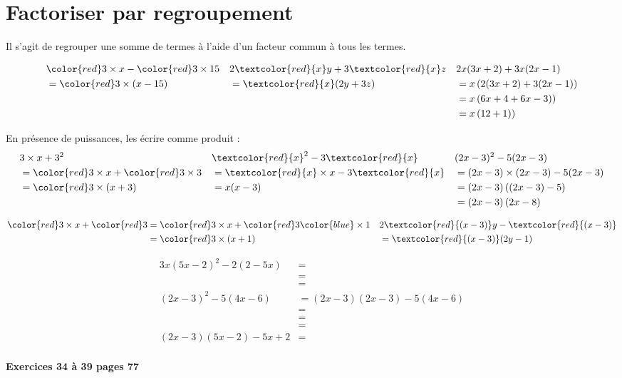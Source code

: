 \documentclass[main.tex]{subfiles}
\begin{document}
\section{Factoriser  par regroupement}
Il s'agit de regrouper une somme de termes à l'aide d'un facteur commun à tous les termes.
\begin{example}\hfill 
	\begin{align*}
		&	{\color{red}3}\times x - {\color{red}3}\times 15  
		&&  
		2\textcolor{red}{x}y+3\textcolor{red}{x}z
		&& 2x(3x+2) + 3x(2x-1) \\
		&= {\color{red}3} \times (x-15) && =\textcolor{red}{x}(2y+3z)
		&& = x\left(2 (3x+2) + 3 (2x-1)\right) \\
		& && && = x\left(6x+4 + 6x-3)\right)\\
		& && && = x\left(12+1)\right)
	\end{align*}
\end{example}
\begin{example}[Puissances] En présence de puissances, les écrire comme produit : 
	\begin{align*}
		&3\times x + {3}^2   
		&&\textcolor{red}{x}^2-3\textcolor{red}{x}
		&& (2x-3)^2- 5(2x-3) \\
		& = {\color{red}3}\times x + {\color{red}3}\times 3
		&&  =\textcolor{red}{x}\times x-3\textcolor{red}{x}  
		&&=(2x-3)\times(2x-3)-5(2x-3)  \\
		&= {\color{red}3}\times (x+3)    &&=x(x-3) &&= (2x-3) \left((2x-3)-5\right) \\
		&    && &&= (2x-3) \left(2x-8\right) 
	\end{align*}  
\end{example}
\begin{example}[règle du 1]
	\begin{align*}
		{\color{red}3} \times x + {\color{red}3} &= {\color{red}3}\times x + {\color{red}3}{\color{blue} \times 1}  && 2\textcolor{red}{(x-3)}y-\textcolor{red}{(x-3)}  \\
		&= {\color{red}3}\times (x+1) && = \textcolor{red}{(x-3)} (2 y -1)
	\end{align*}
\end{example}
\begin{example}
	\begin{align*}
		3x(5x-2)^2-2(2-5x) & = \\
		&=   \\
		&=  \\
		(2x-3)^2- 5(4x-6) 	& = (2x-3)(2x-3)- 5(4x-6) \\
		&=  \\
		&=   \\
		&=  \\  
		(2x-3)(5x-2)- 5x+2 	& =   \\
	\end{align*}  
\end{example}
\textbf{Exercices 34 à 39 pages 77} 
 
\end{document}
